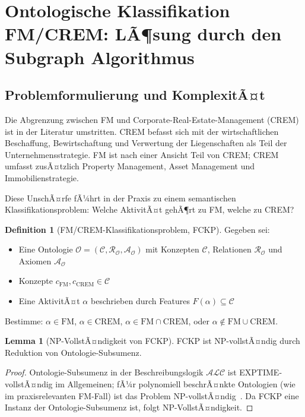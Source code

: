 ﻿\documentclass[a4paper,12pt]{article}
\theoremstyle{definition}
\newtheorem{definition}{Definition}[section]
\newtheorem{lemma}{Lemma}[section]
\begin{document}
\section{Ontologische Klassifikation FM/CREM: LÃ¶sung durch den Subgraph Algorithmus}
\label{sec:onto}

\subsection{Problemformulierung und KomplexitÃ¤t}

Die Abgrenzung zwischen FM und Corporate-Real-Estate-Management (CREM) ist in der
Literatur umstritten. CREM befasst sich mit der wirtschaftlichen Beschaffung,
Bewirtschaftung und Verwertung der Liegenschaften als Teil der Unternehmensstrategie.
FM ist nach einer Ansicht Teil von CREM; CREM umfasst zusÃ¤tzlich Property Management,
Asset Management und Immobilienstrategie.

Diese UnschÃ¤rfe fÃ¼hrt in der Praxis zu einem semantischen Klassifikationsproblem:
Welche AktivitÃ¤t gehÃ¶rt zu FM, welche zu CREM?

\begin{definition}[FM/CREM-Klassifikationsproblem, FCKP]
\label{def:fckp}
Gegeben sei:
\begin{itemize}
    \item Eine Ontologie $\mathcal{O} = (\mathcal{C}, \mathcal{R}_{\mathcal{O}}, \mathcal{A}_{\mathcal{O}})$
          mit Konzepten $\mathcal{C}$, Relationen $\mathcal{R}_{\mathcal{O}}$ und Axiomen $\mathcal{A}_{\mathcal{O}}$
    \item Konzepte $c_{\mathrm{FM}}, c_{\mathrm{CREM}} \in \mathcal{C}$
    \item Eine AktivitÃ¤t $\alpha$ beschrieben durch Features $F(\alpha) \subseteq \mathcal{C}$
\end{itemize}
Bestimme: $\alpha \in \mathrm{FM}$, $\alpha \in \mathrm{CREM}$, $\alpha \in \mathrm{FM} \cap \mathrm{CREM}$,
oder $\alpha \notin \mathrm{FM} \cup \mathrm{CREM}$.
\end{definition}

\begin{lemma}[NP-VollstÃ¤ndigkeit von FCKP]
\label{lem:fckp-np}
FCKP ist NP-vollstÃ¤ndig durch Reduktion von Ontologie-Subsumenz.
\end{lemma}

\begin{proof}
Ontologie-Subsumenz in der Beschreibungslogik $\mathcal{ALC}$ ist EXPTIME-vollstÃ¤ndig
im Allgemeinen; fÃ¼r polynomiell beschrÃ¤nkte Ontologien (wie im praxisrelevanten FM-Fall)
ist das Problem NP-vollstÃ¤ndig~\cite{horrocks2003}.
Da FCKP eine Instanz der Ontologie-Subsumenz ist, folgt NP-VollstÃ¤ndigkeit.
\end{proof}
\end{document}
